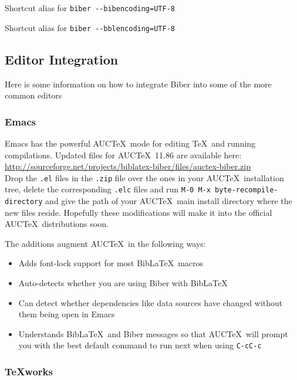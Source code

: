 \documentclass{ltxdockit}
\def\biberex#1{\hbox{\hspace{-4em}\texttt{\small \detokenize{#1}}}}
\begin{document}
\biberex{biber -u}

\noindent Shortcut alias for \verb+biber --bibencoding=UTF-8+

\biberex{biber -U}

\noindent Shortcut alias for \verb+biber --bblencoding=UTF-8+

\subsection{Editor Integration}

Here is some information on how to integrate Biber into some of the
more common editors

\subsubsection{Emacs}

Emacs has the powerful AUC\TeX\ mode for editing \TeX\ and running
compilations. Updated files for AUC\TeX\ 11.86 are available here:\\[2ex]

\noindent\url{http://sourceforge.net/projects/biblatex-biber/files/auctex-biber.zip}\\[2ex]

\noindent Drop the \verb+.el+ files in the \verb+.zip+ file over the
ones in your AUC\TeX\ installation tree, delete the corresponding
\verb+.elc+ files and run \verb+M-0 M-x byte-recompile-directory+ and
give the path of your AUC\TeX\ main install directory where the new
files reside. Hopefully these modifications will make it into the
official AUC\TeX\ distributions soon.

The additions augment AUC\TeX\ in the following ways:

\begin{itemize}
\item Adds font-lock support for most Bib\LaTeX\ macros
\item Auto-detects whether you are using Biber with Bib\LaTeX\
\item Can detect whether dependencies like data sources have changed without
  them being open in Emacs
\item Understands Bib\LaTeX\ and Biber messages so that
  AUC\TeX\ will prompt you with the best default command to run next
  when using \verb+C-cC-c+
\end{itemize}

\subsubsection{\TeX works}
\end{document}
